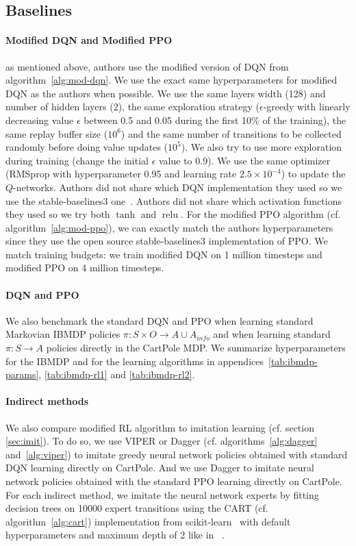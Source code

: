 \subsection{Baselines}
\paragraph{Modified DQN and Modified PPO} as mentioned above, authors use the modified version of DQN from algorithm~\ref{alg:mod-dqn}.
We use the exact same hyperparameters for modified DQN as the authors when possible. 
We use the same layers width (128) and number of hidden layers (2), the same exploration strategy ($\epsilon$-greedy with linearly decreasing value $\epsilon$ between 0.5 and 0.05 during the first 10\% of the training),
the same replay buffer size ($10^6$) and the same number of transitions to be collected randomly before doing value updates ($10^5$).
We also try to use more exploration during training (change the initial $\epsilon$ value to 0.9).
We use the same optimizer (RMSprop with hyperparameter 0.95 and learning rate $2.5 \times 10^{-4}$) to update the $Q$-networks.
Authors did not share which DQN implementation they used so we use the stable-baselines3 one~\cite{stable-baselines3}.
Authors did not share which activation functions they used so we try both $\operatorname{tanh}$ and $\operatorname{relu}$. 
For the modified PPO algorithm (cf. algorithm~\ref{alg:mod-ppo}), we can exactly match the authors hyperparameters since they use the open source stable-baselines3 implementation of PPO.
We match training budgets: we train modified DQN on 1 million timesteps and modified PPO on 4 million timesteps.

\paragraph{DQN and PPO} We also benchmark the standard DQN and PPO when learning standard Markovian IBMDP policies $\pi:S\times O\rightarrow A\cup A_{info}$ and when learning standard $\pi:S\rightarrow A$ policies directly in the CartPole MDP.
We summarize hyperparameters for the IBMDP and for the learning algorithms in appendices~\ref{tab:ibmdp-params}, \ref{tab:ibmdp-rl1} and \ref{tab:ibmdp-rl2}.

\paragraph{Indirect methods} We also compare modified RL algorithm to imitation learning (cf. section \ref{sec:imit}).
To do so, we use VIPER or Dagger (cf. algorithms~\ref{alg:dagger} and~\ref{alg:viper}) to imitate greedy neural network policies obtained with standard DQN learning directly on CartPole.
And we use Dagger to imitate neural network policies obtained with the standard PPO learning directly on CartPole. 
For each indirect method, we imitate the neural network experts by fitting decision trees on 10000 expert transitions using the CART (cf. algorithm~\ref{alg:cart}) implementation from scikit-learn~\cite{scikit-learn} with default hyperparameters and maximum depth of 2 like in ~\cite{topin2021iterative}.
    

